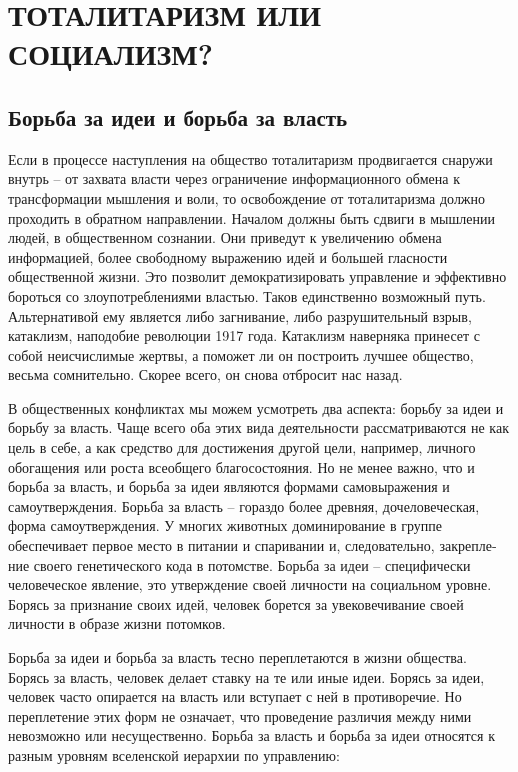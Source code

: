 \documentclass{book}
\begin{document}
\chapter{ТОТАЛИТАРИЗМ ИЛИ СОЦИАЛИЗМ?}

\section{Борьба за идеи и борьба за власть}

Если в процессе наступления на общество тоталитаризм продвигается снаружи внутрь -- от захвата власти через огра­ничение информационного обмена к трансформации мышле­ния и воли, то освобождение от тоталитаризма должно прохо­дить в обратном направлении. Началом должны быть сдвиги в мышлении людей, в общественном сознании. Они приведут к увеличению обмена информацией, более свободному выра­жению идей и большей гласности общественной жизни. Это поз­волит демократизировать управление и эффективно бороться со злоупотреблениями властью. Таков единственно возможный путь. Альтернативой ему является либо загнивание, либо разрушительный взрыв, катаклизм, наподобие революции 1917 года. Катаклизм наверняка принесет с собой неисчислимые жертвы, а поможет ли он построить лучшее общество, весьма сомнительно. Скорее всего, он снова отбросит нас назад.

В общественных конфликтах мы можем усмотреть два ас­пекта: борьбу за идеи и борьбу за власть. Чаще всего оба этих вида деятельности рассматриваются не как цель в себе, а как средство для достижения другой цели, например, личного обогащения или роста всеобщего благосостояния. Но не менее важно, что и борьба за власть, и борьба за идеи являются формами самовыражения и самоутверждения. Борьба за власть -- гораздо более древняя, дочеловеческая, форма самоутверждения. У многих животных доминирование в группе обеспечивает пер­вое место в питании и спаривании и, следовательно, закрепле­ние своего генетического кода в потомстве. Борьба за идеи -- специфически человеческое явление, это утверждение своей личности на социальном уровне. Борясь за признание своих идей, человек борется за увековечивание своей личности в об­разе жизни потомков.

Борьба за идеи и борьба за власть тесно переплетаются в жиз­ни общества. Борясь за власть, человек делает ставку на те или иные идеи. Борясь за идеи, человек часто опирается на власть или вступает с ней в противоречие. Но переплетение этих форм не означает, что проведение различия между ними невозмож­но или несущественно. Борьба за власть и борьба за идеи отно­сятся к разным уровням вселенской иерархии по управлению:
\end{document}
